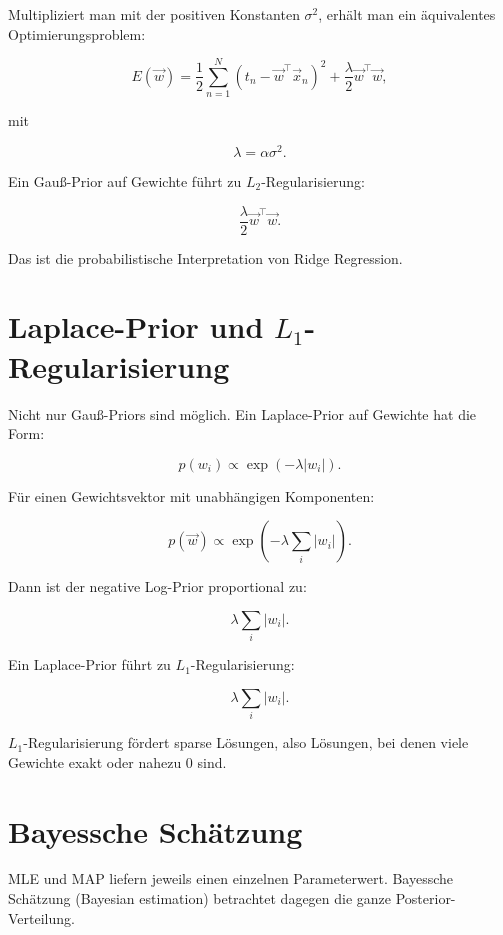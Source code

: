 Multipliziert man mit der positiven Konstanten \(\sigma^2\), erhält man ein äquivalentes Optimierungsproblem:

\[
    E(\vec{w})
    =
    \frac{1}{2}
    \sum_{n=1}^{N}
    \left(
        t_n
        -
        \vec{w}^{\top}\vec{x}_n
    \right)^2
    +
    \frac{\lambda}{2}
    \vec{w}^{\top}\vec{w},
\]

mit

\[
    \lambda = \alpha\sigma^2.
\]

\begin{conceptbox}
Ein Gauß-Prior auf Gewichte führt zu \(L_2\)-Regularisierung:

\[
    \frac{\lambda}{2}
    \vec{w}^{\top}\vec{w}.
\]

Das ist die probabilistische Interpretation von Ridge Regression.
\end{conceptbox}

\section{Laplace-Prior und \(L_1\)-Regularisierung}

Nicht nur Gauß-Priors sind möglich.
Ein Laplace-Prior auf Gewichte hat die Form:

\[
    p(w_i)
    \propto
    \exp(-\lambda |w_i|).
\]

Für einen Gewichtsvektor mit unabhängigen Komponenten:

\[
    p(\vec{w})
    \propto
    \exp\left(
        -\lambda
        \sum_{i}
        |w_i|
    \right).
\]

Dann ist der negative Log-Prior proportional zu:

\[
    \lambda
    \sum_i
    |w_i|.
\]

\begin{conceptbox}
Ein Laplace-Prior führt zu \(L_1\)-Regularisierung:

\[
    \lambda
    \sum_i
    |w_i|.
\]

\(L_1\)-Regularisierung fördert sparse Lösungen, also Lösungen, bei denen viele Gewichte exakt oder nahezu \(0\) sind.
\end{conceptbox}

\section{Bayessche Schätzung}

MLE und MAP liefern jeweils einen einzelnen Parameterwert.
Bayessche Schätzung (Bayesian estimation) betrachtet dagegen die ganze Posterior-Verteilung.

